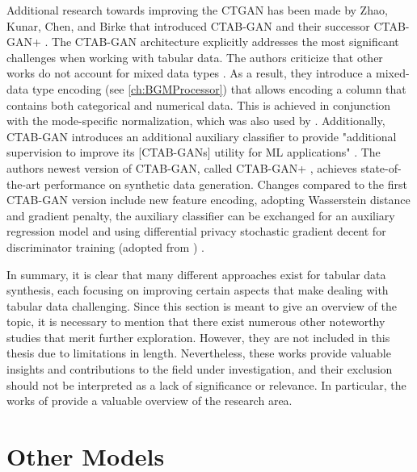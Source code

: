 Additional research towards improving the CTGAN has been made by Zhao, Kunar, Chen, and Birke that introduced CTAB-GAN \cite{zhao2021CTABGANEffectiveTablea} and their successor CTAB-GAN+ \cite{zhao2022CTABGANEnhancingTabular}.
The CTAB-GAN architecture explicitly addresses the most significant challenges when working with tabular data.
The authors criticize that other works do not account for mixed data types \cite{zhao2022CTABGANEnhancingTabular}.
As a result, they introduce a mixed-data type encoding (see \autoref{ch:BGMProcessor}) that allows encoding a column that contains both categorical and numerical data.
This is achieved in conjunction with the mode-specific normalization, which was also used by \cite{xu2018SynthesizingTabularData, xu2019ModelingTabularData}.
Additionally, CTAB-GAN introduces an additional auxiliary classifier to provide "additional supervision to improve its [CTAB-GANs] utility for ML applications" \cite[p. 2]{zhao2021CTABGANEffectiveTablea}.
The authors newest version of CTAB-GAN, called CTAB-GAN+ \cite{zhao2022CTABGANEnhancingTabular}, achieves state-of-the-art performance on synthetic data generation.
Changes compared to the first CTAB-GAN version include new feature encoding, adopting Wasserstein distance and gradient penalty, the auxiliary classifier can be exchanged for an auxiliary regression model
and using differential privacy stochastic gradient decent \cite{abadi2016DeepLearningDifferential} for discriminator training (adopted from \cite{jordon2018PATEGANGeneratingSynthetic}) \cite{zhao2022CTABGANEnhancingTabular}.

In summary, it is clear that many different approaches exist for tabular data synthesis, each focusing on improving certain aspects that make dealing with tabular data challenging.
Since this section is meant to give an overview of the topic, 
it is necessary to mention that there exist numerous other noteworthy studies that merit further exploration. 
However, they are not included in this thesis due to limitations in length. 
Nevertheless, these works provide valuable insights and contributions to the field under investigation, and their exclusion should not be interpreted as a lack of significance or relevance. 
In particular, the works of \cite{fan2020RelationalDataSynthesisa, hernandez2022SyntheticDataGeneration, bourou2021ReviewTabularData} provide a valuable overview of the research area.


\section{Other Models}
\label{ch:relatedWork-Other Models}

